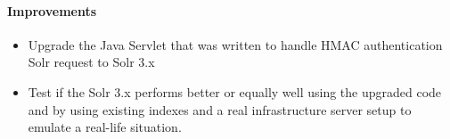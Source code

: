\paragraph{Improvements}
\begin{itemize}
\item Upgrade the Java Servlet that was written to handle HMAC authentication Solr request to Solr 3.x
\item Test if the Solr 3.x performs better or equally well using the upgraded code and by using existing indexes and a real infrastructure server setup to emulate a real-life situation.
\end{itemize}
